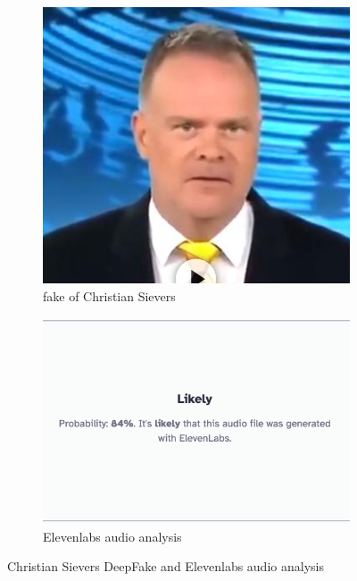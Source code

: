 \documentclass[
  a4paper,  %
  twoside,  %
  bibliography=totoc,
  headsepline,
  cleardoublepage=empty,
  parskip=half,
  draft=false
]{scrbook}
\begin{document}
\begin{figure}[h]
  \centering
  \begin{subfigure}[b]{0.45\textwidth}
    \includegraphics[width=\textwidth]{./graphics/images/sievers.png}
    \caption{fake of Christian Sievers \cite{zdfDeepfakeMitZDFModerator}}
    \label{fig:sievers-fake}
  \end{subfigure}
  \hfill
  \begin{subfigure}[b]{0.5\textwidth}
    \includegraphics[width=\textwidth]{./graphics/images/sievers-11labs.png}
    \caption{Elevenlabs audio analysis \cite{elevenlabsAISpeechClassifier}}
    \label{fig:sievers-11labs}
  \end{subfigure}
  \caption{Christian Sievers DeepFake and Elevenlabs audio analysis}
\end{figure}
\end{document}
